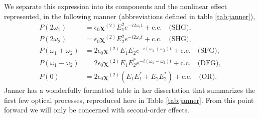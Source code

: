 We separate this expression into its components and the nonlinear effect
represented, in the following manner (abbreviations defined in table
\ref{tab:janner}),
\begin{equation}\label{eq_list}
\begin{split}
P(2\omega_{1}) 
&= \epsilon_{0}\boldsymbol{\chi}^{(2)}E^{2}_{1}e^{-i2\omega_{1}t}
 + \text{c.c.}\quad\text{(SHG)},\\
P(2\omega_{2})
&= \epsilon_{0}\boldsymbol{\chi}^{(2)}E^{2}_{2}e^{-i2\omega_{2}t}
 + \text{c.c.}\quad\text{(SHG)},\\
P(\omega_{1}+\omega_{2})
&= 2\epsilon_{0}\boldsymbol{\chi}^{(2)}E_{1}E_{2}e^{-i(\omega_{1}+\omega_{2})t}
 + \text{c.c.}\quad\text{(SFG)},\\
P(\omega_{1}-\omega_{2})
&= 2\epsilon_{0}\boldsymbol{\chi}^{(2)}E_{1}E^{\ast}_{2}e^{-i(\omega_{1}-\omega_{2})t}
 + \text{c.c.}\quad\text{(DFG)},\\
P(0)
&= 2\epsilon_{0}\boldsymbol{\chi}^{(2)}\left(E_{1}E^{\ast}_{1}
 + E_{2}E^{\ast}_{2}\right) + \text{c.c.}\quad\text{(OR)}.
\end{split}
\end{equation}
Janner \cite{janner1998exciton} has a wonderfully formatted table in her
dissertation that summarizes the first few optical processes, reproduced here in
Table \ref{tab:janner}. From this point forward we will only be concerned with
second-order effects.

